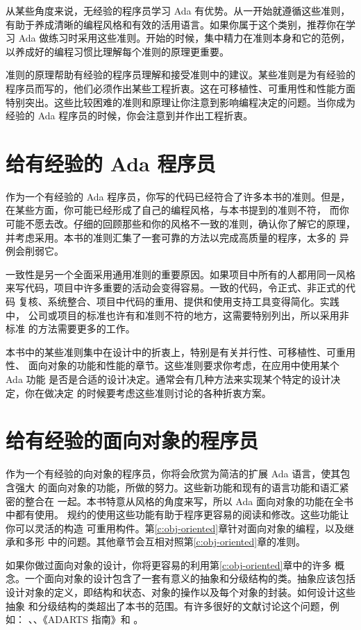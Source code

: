 从某些角度来说，无经验的程序员学习 Ada 有优势。从一开始就遵循这些准则，
有助于养成清晰的编程风格和有效的活用语言。如果你属于这个类别，推荐你在学习
Ada 做练习时采用这些准则。开始的时候，集中精力在准则本身和它的范例，
以养成好的编程习惯比理解每个准则的原理更重要。

准则的原理帮助有经验的程序员理解和接受准则中的建议。某些准则是为有经验的
程序员而写的，他们必须作出某些工程折衷。这在可移植性、可重用性和性能方面
特别突出。这些比较困难的准则和原理让你注意到影响编程决定的问题。当你成为
经验的 Ada 程序员的时候，你会注意到并作出工程折衷。

\section{给有经验的 Ada 程序员}
作为一个有经验的 Ada 程序员，你写的代码已经符合了许多本书的准则。但是，
在某些方面，你可能已经形成了自己的编程风格，与本书提到的准则不符，
而你可能不愿去改。仔细的回顾那些和你的风格不一致的准则，确认你了解它的原理，
并考虑采用。本书的准则汇集了一套可靠的方法以完成高质量的程序，太多的
异例会削弱它。

一致性是另一个全面采用通用准则的重要原因。如果项目中所有的人都用同一风格
来写代码，项目中许多重要的活动会变得容易。一致的代码，令正式、非正式的代码
复核、系统整合、项目中代码的重用、提供和使用支持工具变得简化。实践中，
公司或项目的标准也许有和准则不符的地方，这需要特别列出，所以采用非标准
的方法需要更多的工作。

本书中的某些准则集中在设计中的折衷上，特别是有关并行性、可移植性、可重用性、
面向对象的功能和性能的章节。这些准则要求你考虑，在应用中使用某个 Ada 功能
是否是合适的设计决定。通常会有几种方法来实现某个特定的设计决定，你在做决定
的时候要考虑这些准则讨论的各种折衷方案。

\section{给有经验的面向对象的程序员}
作为一个有经验的向对象的程序员，你将会欣赏为简洁的扩展 Ada 语言，使其包含强大
的面向对象的功能，所做的努力。这些新功能和现有的语言功能和语汇紧密的整合在
一起。本书特意从风格的角度来写，所以 Ada 面向对象的功能在全书中都有使用。
规约的使用这些功能有助于程序更容易的阅读和修改。这些功能让你可以灵活的构造
可重用构件。第\ref{c:obj-oriented}章针对面向对象的编程，以及继承和多形
中的问题。其他章节会互相对照第\ref{c:obj-oriented}章的准则。

如果你做过面向对象的设计，你将更容易的利用第\ref{c:obj-oriented}章中的许多
概念。一个面向对象的设计包含了一套有意义的抽象和分级结构的类。抽象应该包括
设计对象的定义，即结构和状态、对象的操作以及每个对象的封装。如何设计这些抽象
和分级结构的类超出了本书的范围。有许多很好的文献讨论这个问题，例如：
\cite{rumbaugh91}、\cite{jacobson92}、《ADARTS 指南》\cite{spc93}和
\cite{booch94}。

